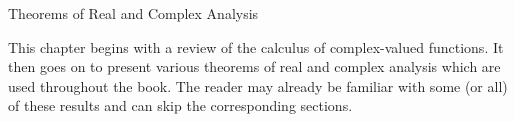 \begin{chapter}{Theorems of Real and Complex Analysis}

This chapter begins with a review of the calculus of complex-valued functions. It then goes on to present various theorems of real and complex analysis which are used throughout the book. The reader may already be familiar with some (or all) of these results and can skip the corresponding sections.

	
	
	
	
	
	
\end{chapter}
